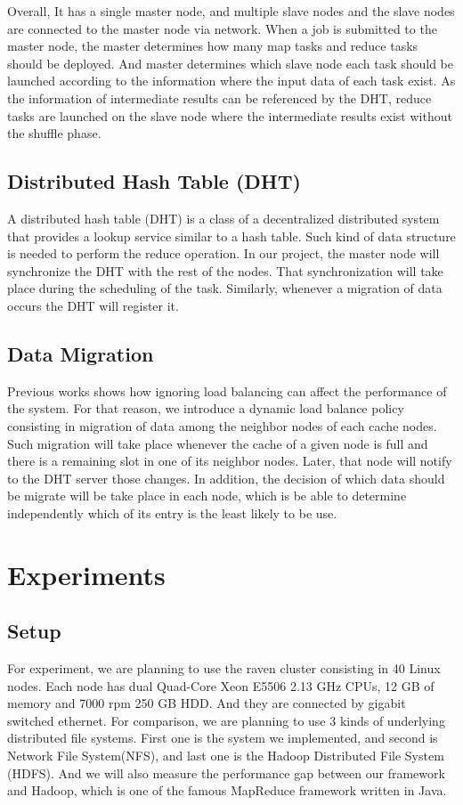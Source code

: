 \documentclass[11pt,a4paper]{article}
\begin{document}
\begin{multicols}{2}
Overall, It has a single master node, and multiple slave nodes and the slave nodes are connected
to the master node via network. When a job is submitted to the master node, the master determines
how many map tasks and reduce tasks should be deployed. And master determines which slave node
each task should be launched according to the information where the input data of each task
exist. As the information of intermediate results can be referenced by the DHT, reduce tasks
are launched on the slave node where the intermediate results exist without the shuffle phase.

\subsection*{Distributed Hash Table (DHT)}
A distributed hash table (DHT) is a class of a decentralized distributed system that provides
a lookup service similar to a hash table. Such kind of data structure is needed to perform
the reduce operation. In our project, the master node will synchronize the DHT with the rest
of the nodes. That synchronization will take place during the scheduling of the task. Similarly,
whenever a migration of data occurs the DHT will register it. 

\subsection*{Data Migration}
Previous works shows how ignoring load balancing can affect the performance of the system.
For that reason, we introduce a dynamic load balance policy consisting in migration of data among
the neighbor nodes of each cache nodes. Such migration will take place whenever the cache of a given node is full 
and there is a remaining slot in one of its neighbor nodes. Later, that node will notify to the DHT server 
those changes. In addition, the decision of which data should be migrate will be take place in each node,
which is be able to determine independently which of its entry is the least likely to be use.

\section*{Experiments}
\subsection*{Setup}
For experiment, we are planning to use the raven cluster consisting in 40 Linux nodes.
Each node has dual Quad-Core Xeon E5506 2.13 GHz CPUs, 12 GB of memory and 7000 rpm 250 GB
HDD. And they are connected by gigabit switched ethernet.
For comparison, we are planning to use 3 kinds of underlying distributed file systems. First
one is the system we implemented, and second is Network File System(NFS), and last one is the
Hadoop Distributed File System (HDFS).
And we will also measure the performance gap between our framework and Hadoop, which is one
of the famous MapReduce framework written in Java.


\end{multicols}
\end{document}
